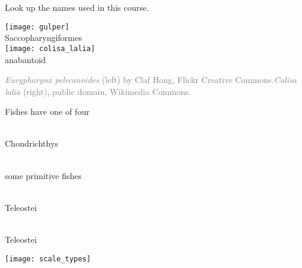 \documentclass[t]{beamer}
\begin{document}
\begin{frame}[t,plain]{Look up the names used in this course.}
\begin{multicols}{2}
	\begin{center}
		\texttt{[image: gulper]} \\
		Saccopharyngiformes\\
		\columnbreak
		\texttt{[image: colisa\_lalia]} \\
		anabantoid\\
	\end{center}
\end{multicols}
	\vfilll
	\tiny\textcolor{gray}{\textit{Eurypharynx pelecanoides} (left) by Claf Hong, Flickr Creative Commons.\hfill\textit{Colisa lalia} (right), public domain, Wikimedia Commons.}
\end{frame}


{
	\begin{frame}[b,plain]
\end{frame}
}

\begin{frame}[t,plain]{Fishes have one of four }
\begin{minipage}{0.3\textwidth}
\raggedright

\\{\small Chondrichthys}

\vspace{2em}

\\ {\small some primitive fishes}

\vspace{2em}

\\ {\small Teleostei}

\vspace{2em}

 \\{\small Teleostei}

\vspace{2em}

\end{minipage}\hfill\begin{minipage}{0.6\textwidth}

\texttt{[image: scale\_types]}
\end{minipage}
\end{frame}
\end{document}

